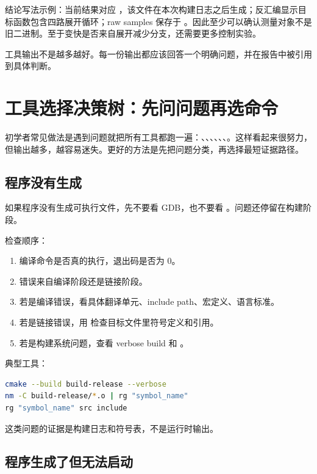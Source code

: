 结论写法示例：当前结果对应 ，该文件在本次构建日志之后生成；反汇编显示目标函数包含四路展开循环；raw samples 保存于 。因此至少可以确认测量对象不是旧二进制。至于变快是否来自展开减少分支，还需要更多控制实验。

\begin{mentalmodel}
工具输出不是越多越好。每一份输出都应该回答一个明确问题，并在报告中被引用到具体判断。
\end{mentalmodel}

\section{工具选择决策树：先问问题再选命令}

初学者常见做法是遇到问题就把所有工具都跑一遍：、、、、、、。这样看起来很努力，但输出越多，越容易迷失。更好的方法是先把问题分类，再选择最短证据路径。

\subsection{程序没有生成}

如果程序没有生成可执行文件，先不要看 GDB，也不要看 。问题还停留在构建阶段。

检查顺序：

\begin{enumerate}
  \item 编译命令是否真的执行，退出码是否为 0。
  \item 错误来自编译阶段还是链接阶段。
  \item 若是编译错误，看具体翻译单元、include path、宏定义、语言标准。
  \item 若是链接错误，用  检查目标文件里符号定义和引用。
  \item 若是构建系统问题，查看 verbose build 和 。
\end{enumerate}

典型工具：

\begin{lstlisting}[language=bash]
cmake --build build-release --verbose
nm -C build-release/*.o | rg "symbol_name"
rg "symbol_name" src include
\end{lstlisting}

这类问题的证据是构建日志和符号表，不是运行时输出。

\subsection{程序生成了但无法启动}


